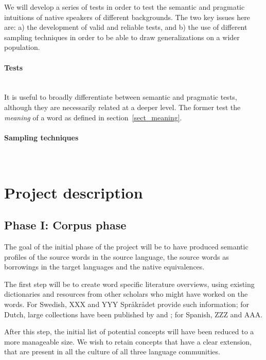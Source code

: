 \documentclass[a4paper]{article}
\begin{document}
We will develop a series of tests in order to test the semantic and pragmatic intuitions of native speakers of different backgrounds.
The two key issues here are: a) the development of valid and reliable tests, and b) the use of different sampling techniques in order to be able to draw generalizations on a wider population.

\paragraph{Tests}
\hspace{0pt} \\
It is useful to broadly differentiate between semantic and pragmatic tests, although they are necessarily related at a deeper level.
The former test the \emph{meaning} of a word as defined in section~\ref{sect_meaning}.


\paragraph{Sampling techniques} 
~\\









\section{Project description}



\subsection{Phase I: Corpus phase}
\label{sect_corpus}

The goal of the initial phase of the project will be to have produced semantic profiles of the source words in the source language, the source words as borrowings in the target languages and the native equivalences. 

The first step will be to create word specific literature overviews, using existing dictionaries and resources from other scholars who might have worked on the words. For Swedish, XXX and YYY Spr\aa kr\aa det provide such information; for Dutch, large collections have been published by \cite{Koops2009} and \cite{Braamkolk2005}; for Spanish, ZZZ and AAA.

After this step, the initial list of potential concepts will have been reduced to a more manageable size. We wish to retain concepts that have a clear extension, that are present in all the culture of all three language communities.
\end{document}
